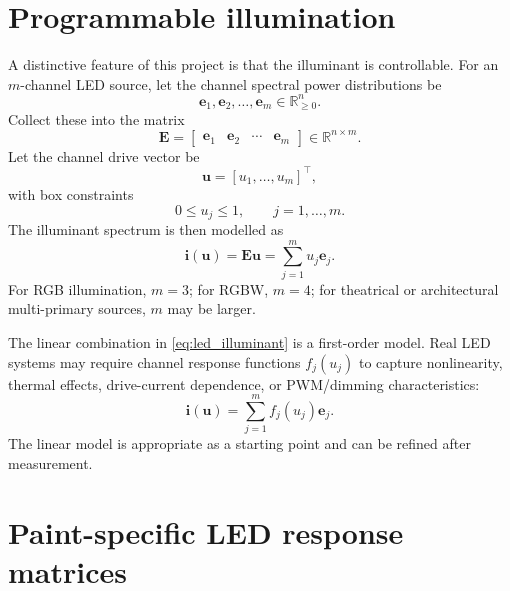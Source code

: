 \documentclass[11pt,a4paper]{article}
\newcommand{\R}{\mathbb{R}}
\newcommand{\vect}[1]{\boldsymbol{#1}}
\newcommand{\mat}[1]{\mathbf{#1}}
\begin{document}
\section{Programmable illumination}

A distinctive feature of this project is that the illuminant is controllable. For an $m$-channel LED source, let the channel spectral power distributions be
\begin{equation}
 \vect{e}_1,\vect{e}_2,\ldots,\vect{e}_m\in\R^n_{\ge 0}.
\end{equation}
Collect these into the matrix
\begin{equation}
 \mat{E}=\begin{bmatrix}\vect{e}_1 & \vect{e}_2 & \cdots & \vect{e}_m\end{bmatrix}\in\R^{n\times m}.
\end{equation}
Let the channel drive vector be
\begin{equation}
 \vect{u}=[u_1,\ldots,u_m]^\top,
\end{equation}
with box constraints
\begin{equation}
 0\le u_j\le 1,\qquad j=1,\ldots,m.
 \label{eq:channel_box_constraints}
\end{equation}
The illuminant spectrum is then modelled as
\begin{equation}
 \vect{i}(\vect{u})=\mat{E}\vect{u}=\sum_{j=1}^{m}u_j\vect{e}_j.
 \label{eq:led_illuminant}
\end{equation}
For RGB illumination, $m=3$; for RGBW, $m=4$; for theatrical or architectural multi-primary sources, $m$ may be larger.

The linear combination in \cref{eq:led_illuminant} is a first-order model. Real LED systems may require channel response functions $f_j(u_j)$ to capture nonlinearity, thermal effects, drive-current dependence, or PWM/dimming characteristics:
\begin{equation}
 \vect{i}(\vect{u})=\sum_{j=1}^{m} f_j(u_j)\vect{e}_j.
 \label{eq:nonlinear_led}
\end{equation}
The linear model is appropriate as a starting point and can be refined after measurement.

\section{Paint-specific LED response matrices}
\end{document}

